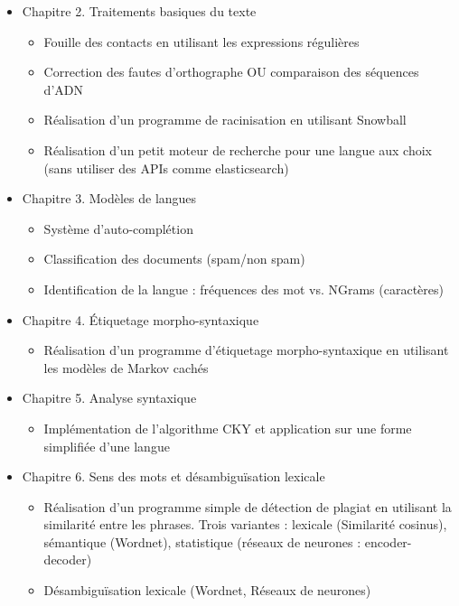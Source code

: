 \documentclass[11pt, a4paper]{article}
\begin{document}
\begin{itemize}
	
	\item Chapitre 2. Traitements basiques du texte
	\begin{itemize}
		\item Fouille des contacts en utilisant les expressions régulières
		\item Correction des fautes d'orthographe OU comparaison des séquences d'ADN
		\item Réalisation d'un programme de racinisation en utilisant Snowball
		\item Réalisation d'un petit moteur de recherche pour une langue aux choix (sans utiliser des APIs comme elasticsearch)
	\end{itemize}

	\item Chapitre 3. Modèles de langues
	\begin{itemize}
		\item Système d'auto-complétion
		\item Classification des documents (spam/non spam)
		\item Identification de la langue : fréquences des mot vs. NGrams (caractères) %
	\end{itemize}

	\item Chapitre 4. Étiquetage morpho-syntaxique
	\begin{itemize}
		\item Réalisation d'un programme d'étiquetage morpho-syntaxique en utilisant les modèles de Markov cachés
	\end{itemize}

	\item Chapitre 5. Analyse syntaxique
	\begin{itemize}
		\item Implémentation de l'algorithme CKY et application sur une forme simplifiée d'une langue 
	\end{itemize}

	\item Chapitre 6. Sens des mots et désambiguïsation lexicale
	\begin{itemize}
		\item Réalisation d'un programme simple de détection de plagiat en utilisant la similarité entre les phrases. Trois variantes : lexicale (Similarité cosinus), sémantique (Wordnet), statistique (réseaux de neurones : encoder-decoder)
		\item Désambiguïsation lexicale (Wordnet, Réseaux de neurones)
	\end{itemize}


\end{itemize}
\end{document}
